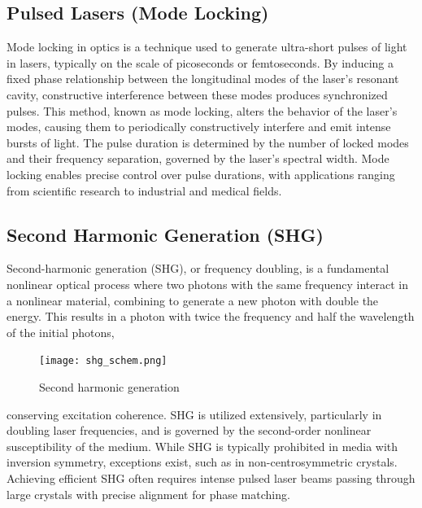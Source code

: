 \subsection{Pulsed Lasers (Mode Locking)}
    Mode locking in optics is a technique used to generate ultra-short pulses of light in lasers, typically on the scale of picoseconds or femtoseconds. 
    By inducing a fixed phase relationship between the longitudinal modes of the laser's resonant cavity, constructive interference between these modes produces synchronized pulses. 
    This method, known as mode locking, alters the behavior of the laser's modes, causing them to periodically constructively interfere and emit intense bursts of light. 
    The pulse duration is determined by the number of locked modes and their frequency separation, governed by the laser's spectral width. 
    Mode locking enables precise control over pulse durations, with applications ranging from scientific research to industrial and medical fields.

\subsection{Second Harmonic Generation (SHG)}
    Second-harmonic generation (SHG), or frequency doubling, is a fundamental nonlinear optical process where two photons with the same frequency interact in a nonlinear material, combining to generate a new photon with double the energy.
    This results in a photon with twice the frequency and half the wavelength of the initial photons,
    \begin{figure}
        \centering
        \vspace{-\normalbaselineskip}
        \texttt{[image: shg\_schem.png]}
        \vspace{-10pt}
        \caption{Second harmonic generation }
        
        \label{fig:shg:basic}
    \end{figure}
    conserving excitation coherence. SHG is utilized extensively, particularly in doubling laser frequencies, and is governed by the second-order nonlinear susceptibility of the medium. 
    While SHG is typically prohibited in media with inversion symmetry, exceptions exist, such as in non-centrosymmetric crystals. 
    Achieving efficient SHG often requires intense pulsed laser beams passing through large crystals with precise alignment for phase matching.

